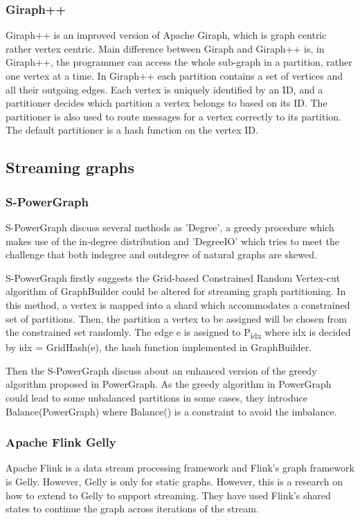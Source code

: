 \documentclass[12pt]{article}
\begin{document}
\subsubsection{Giraph++}
Giraph++\cite{GiraphPlusPlus} is an improved version of Apache Giraph, which is graph centric rather vertex centric. Main difference between Giraph and Giraph++ is, in Giraph++, the programmer can access the whole sub-graph in a partition, rather one vertex at a time. In Giraph++ each partition contains a set of vertices and all their outgoing edges. Each vertex is uniquely identified by an ID, and a partitioner decides which partition a vertex belongs to based on its ID. The partitioner is also used to route messages for a vertex correctly to its partition. The default partitioner is a hash function on the vertex ID.

\subsection{Streaming graphs}

\subsubsection{S-PowerGraph}

S-PowerGraph\cite{S-PowerGraph} discuss several methods as 'Degree', a greedy procedure which makes use of the in-degree distribution and 'DegreeIO' which tries to meet the challenge that both indegree and outdegree of natural graphs are skewed.

S-PowerGraph firstly suggests the Grid-based Constrained Random Vertex-cut algorithm of GraphBuilder\cite{Graphbuilder}  could be altered for streaming graph partitioning. In this method, a vertex is mapped into a shard which accommodates a constrained set of partitions. Then, the partition a vertex to be assigned will be chosen from the constrained set randomly. The edge e is assigned to P\textsubscript{idx} where idx is decided by idx = GridHash(e), the hash function implemented in GraphBuilder.

Then the S-PowerGraph discuss about an enhanced version of the greedy algorithm proposed in PowerGraph\cite{PowerGraph}. As the greedy algorithm in PowerGraph could lead to some unbalanced partitions in some cases, they introduce Balance(PowerGraph) where Balance() is a constraint to avoid the imbalance. 

\subsubsection{Apache Flink Gelly}
Apache Flink is a data stream processing framework and Flink's graph framework is Gelly. However, Gelly is only for static graphs. However, this \cite{Kalavri} is a research on how to extend to Gelly to support streaming. They have used Flink's shared states to continue the graph across iterations of the stream. 
\end{document}
